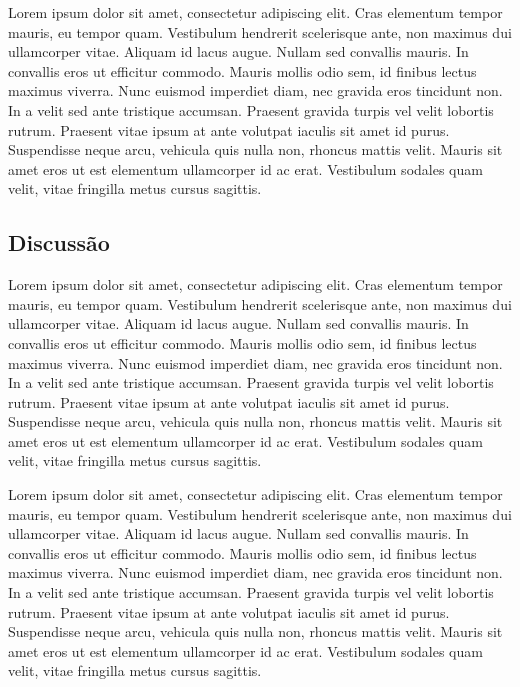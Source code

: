 \documentclass[conference]{IEEEtran}
\begin{document}
Lorem ipsum dolor sit amet, consectetur adipiscing elit. Cras elementum tempor mauris, eu tempor quam. Vestibulum hendrerit scelerisque ante, non maximus dui ullamcorper vitae. Aliquam id lacus augue. Nullam sed convallis mauris. In convallis eros ut efficitur commodo. Mauris mollis odio sem, id finibus lectus maximus viverra. Nunc euismod imperdiet diam, nec gravida eros tincidunt non. In a velit sed ante tristique accumsan. Praesent gravida turpis vel velit lobortis rutrum. Praesent vitae ipsum at ante volutpat iaculis sit amet id purus. Suspendisse neque arcu, vehicula quis nulla non, rhoncus mattis velit. Mauris sit amet eros ut est elementum ullamcorper id ac erat. Vestibulum sodales quam velit, vitae fringilla metus cursus sagittis.

\subsection{Discussão}

Lorem ipsum dolor sit amet, consectetur adipiscing elit. Cras elementum tempor mauris, eu tempor quam. Vestibulum hendrerit scelerisque ante, non maximus dui ullamcorper vitae. Aliquam id lacus augue. Nullam sed convallis mauris. In convallis eros ut efficitur commodo. Mauris mollis odio sem, id finibus lectus maximus viverra. Nunc euismod imperdiet diam, nec gravida eros tincidunt non. In a velit sed ante tristique accumsan. Praesent gravida turpis vel velit lobortis rutrum. Praesent vitae ipsum at ante volutpat iaculis sit amet id purus. Suspendisse neque arcu, vehicula quis nulla non, rhoncus mattis velit. Mauris sit amet eros ut est elementum ullamcorper id ac erat. Vestibulum sodales quam velit, vitae fringilla metus cursus sagittis.

Lorem ipsum dolor sit amet, consectetur adipiscing elit. Cras elementum tempor mauris, eu tempor quam. Vestibulum hendrerit scelerisque ante, non maximus dui ullamcorper vitae. Aliquam id lacus augue. Nullam sed convallis mauris. In convallis eros ut efficitur commodo. Mauris mollis odio sem, id finibus lectus maximus viverra. Nunc euismod imperdiet diam, nec gravida eros tincidunt non. In a velit sed ante tristique accumsan. Praesent gravida turpis vel velit lobortis rutrum. Praesent vitae ipsum at ante volutpat iaculis sit amet id purus. Suspendisse neque arcu, vehicula quis nulla non, rhoncus mattis velit. Mauris sit amet eros ut est elementum ullamcorper id ac erat. Vestibulum sodales quam velit, vitae fringilla metus cursus sagittis.




\end{document}
